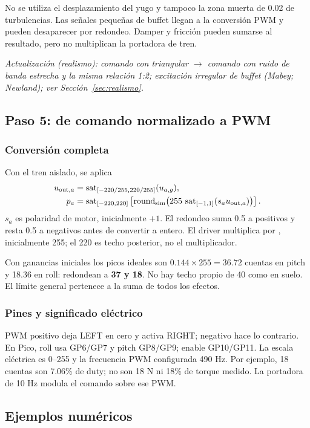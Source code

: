 \documentclass[11pt,a4paper]{article}
\newcommand{\code}[1]{\texttt{\detokenize{#1}}}
\newcommand{\sat}{\operatorname{sat}}
\begin{document}
No se utiliza el desplazamiento del yugo y tampoco la zona muerta de 0.02 de turbulencias. Las señales pequeñas de buffet llegan a la conversión PWM y pueden desaparecer por redondeo. Damper y fricción pueden sumarse al resultado, pero no multiplican la portadora de tren.

\textit{Actualización (realismo): comando con triangular $\rightarrow$ comando con ruido de banda estrecha y la misma relación 1:2; excitación irregular de buffet (Mabey; Newland); ver Sección~\ref{sec:realismo}.}

\subsection{Paso 5: de comando normalizado a PWM}
\subsubsection{Conversión completa}
Con el tren aislado, se aplica
\begin{align}
u_{{\rm out},a}&=\sat_{[-220/255,220/255]}(u_{a,g}),\\
p_a&=\sat_{[-220,220]}\left[\operatorname{round}_{\rm sim}\!\left(255\,
\sat_{[-1,1]}(s_a u_{{\rm out},a})\right)\right].
\end{align}
$s_a$ es polaridad de motor, inicialmente $+1$. El redondeo suma 0.5 a positivos y resta 0.5 a negativos antes de convertir a entero. El driver multiplica por \code{PWM_MAX}, inicialmente 255; el 220 es techo posterior, no el multiplicador.

Con ganancias iniciales los picos ideales son $0.144\times255=36.72$ cuentas en pitch y 18.36 en roll: redondean a \textbf{37 y 18}. No hay techo propio de 40 como en suelo. El límite general pertenece a la suma de todos los efectos.

\subsubsection{Pines y significado eléctrico}
PWM positivo deja LEFT en cero y activa RIGHT; negativo hace lo contrario. En Pico, roll usa GP6/GP7 y pitch GP8/GP9; enable GP10/GP11. La escala eléctrica es 0--255 y la frecuencia PWM configurada 490 Hz. Por ejemplo, 18 cuentas son 7.06\% de duty; no son 18 N ni 18\% de torque medido. La portadora de 10 Hz modula el comando sobre ese PWM.

\subsection{Ejemplos numéricos}
\end{document}
